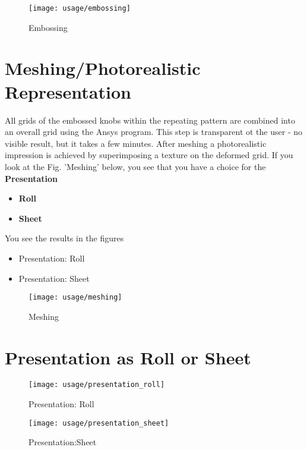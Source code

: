 \begin{figure}[!Hhtp]
  \begin{center}
   \texttt{[image: usage/embossing]}
   \caption{Embossing}
  \end{center}
\end{figure}
\clearpage

\section{Meshing/Photorealistic Representation}

All grids of the embossed knobs within the repeating pattern are combined into an overall
grid using the Ansys program. This step is transparent ot the user - no visible result,
but it takes a few minutes.
After meshing a photorealistic impression is achieved by superimposing a texture on the
deformed grid. If you look at the Fig. 'Meshing' below, you see that you have a choice for
the 
{\bf Presentation}
\begin{itemize}
\item {\bf Roll}
\item {\bf Sheet}
\end{itemize} 

You see the results in the figures 
\begin{itemize}
\item Presentation: Roll
\item Presentation: Sheet
\end{itemize} 
 

\begin{figure}[!Hhtp]
  \begin{center}
   \texttt{[image: usage/meshing]}
   \caption{Meshing}
  \end{center}
\end{figure}
\clearpage

\section{Presentation as Roll or Sheet}

\begin{figure}[!Hhtp]
  \begin{center}
   \texttt{[image: usage/presentation\_roll]}
   \caption{Presentation: Roll}
  \end{center}
\end{figure}

\begin{figure}[!Hhtp]
  \begin{center}
   \texttt{[image: usage/presentation\_sheet]}
   \caption{Presentation:Sheet}
  \end{center}
\end{figure}
\clearpage

